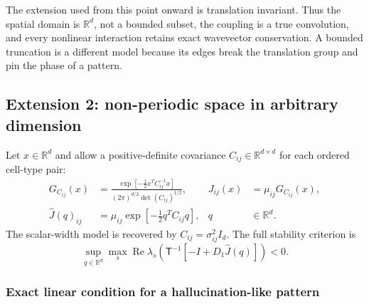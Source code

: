 \documentclass[11pt]{article}
\newcommand{\RePart}{\operatorname{Re}}
\newcommand{\T}{\mathsf T}
\begin{document}
The extension used from this point onward is translation invariant.  Thus
the spatial domain is $\mathbb R^d$, not a bounded subset, the coupling is a
true convolution, and every nonlinear interaction retains exact wavevector
conservation.  A bounded truncation is a different model because its edges
break the translation group and pin the phase of a pattern.

\subsection{Extension 2: non-periodic space in arbitrary dimension}
\label{sec:high-dimensional}

Let $x\in\mathbb R^d$ and allow a positive-definite covariance
$C_{ij}\in\mathbb R^{d\times d}$ for each ordered cell-type pair:
\begin{align}
 G_{C_{ij}}(x)&=\frac{
 \exp[-\tfrac12x^TC_{ij}^{-1}x]}
 {(2\pi)^{d/2}\det(C_{ij})^{1/2}},
 &J_{ij}(x)&=\mu_{ij}G_{C_{ij}}(x),\label{eq:anisotropic-G}\\
 \widehat J(q)_{ij}&=\mu_{ij}
 \exp[-\tfrac12q^TC_{ij}q],
 &q&\in\mathbb R^d.
 \label{eq:anisotropic-symbol}
\end{align}
The scalar-width model is recovered by $C_{ij}=\sigma_{ij}^2I_d$.  The full
stability criterion is
\begin{equation}
 \sup_{q\in\mathbb R^d}\max_s\RePart\lambda_s\!\left(
 \T^{-1}[-I+D_1\widehat J(q)]\right)<0.
 \label{eq:Rd-stability}
\end{equation}

\subsubsection{Exact linear condition for a hallucination-like pattern}
\end{document}
